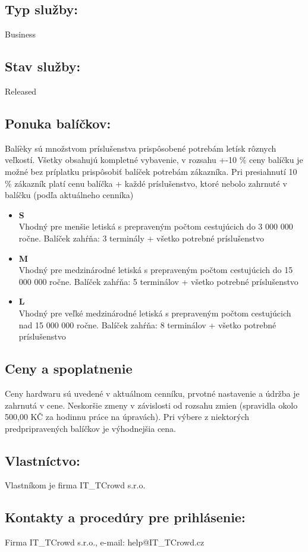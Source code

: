 \documentclass[a4paper, 11pt]{article}
\begin{document}
\subsection*{Typ služby:}
Business
\subsection*{Stav služby:}
Released
\subsection*{Ponuka balíčkov:}
Balíèky sú množstvom príslušenstva prispôsobené potrebám letísk rôznych veľkostí. Všetky obsahujú kompletné vybavenie, v rozsahu +-10 \% ceny balíčku je možné bez príplatku prispôsobiť balíček potrebám zákazníka. Pri presiahnutí 10 \% zákazník platí cenu balíčka + každé príslušenstvo, ktoré nebolo zahrnuté v balíčku (podľa aktuálneho cenníka)
\begin{itemize}
\item \textbf{S} \\
Vhodný pre menšie letiská s prepraveným počtom cestujúcich do 3 000 000 ročne. Balíček zahŕňa: 3 terminály + všetko potrebné príslušenstvo
\item \textbf{M} \\
Vhodný pre medzinárodné letiská s prepraveným počtom cestujúcich do 15 000 000 ročne. Balíček zahŕňa: 5 terminálov + všetko potrebné príslušenstvo
\item \textbf{L} \\
Vhodný pre veľké medzinárodné letiská s prepraveným počtom cestujúcich nad 15 000 000 ročne. Balíček zahŕňa: 8 terminálov + všetko potrebné príslušenstvo
\end{itemize}
\subsection*{Ceny a spoplatnenie}
Ceny hardwaru sú uvedené v aktuálnom cenníku, prvotné nastavenie a údržba je zahrnutá v cene. Neskoršie zmeny v závislosti od rozsahu zmien (spravidla okolo 500,00 KČ za hodinnu práce na úpravách). Pri výbere z niektorých predpripravených balíčkov je výhodnejšia cena.
\subsection*{Vlastníctvo:}
Vlastníkom je firma IT\_TCrowd s.r.o.
\subsection*{Kontakty a procedúry pre prihlásenie:}
Firma IT\_TCrowd s.r.o., e-mail: help@IT\_TCrowd.cz
\end{document}
